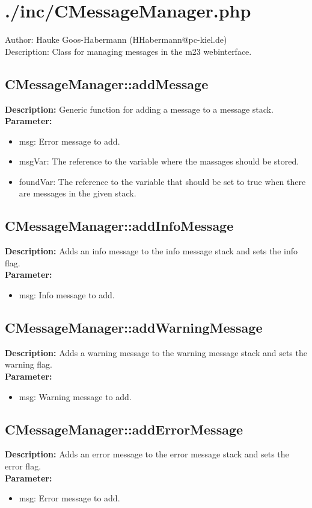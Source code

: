 \newpage\section{./inc/CMessageManager.php}
 Author: Hauke Goos-Habermann (HHabermann@pc-kiel.de)\\
 Description: Class for managing messages in the m23 webinterface.\\

\subsection{CMessageManager::addMessage}
\textbf{Description:} Generic function for adding a message to a message stack.\\
\textbf{Parameter:}
\begin{itemize}
\item msg: Error message to add.
\item msgVar: The reference to the variable where the massages should be stored.
\item foundVar: The reference to the variable that should be set to true when there are messages in the given stack.
\end{itemize}

\subsection{CMessageManager::addInfoMessage}
\textbf{Description:} Adds an info message to the info message stack and sets the info flag.\\
\textbf{Parameter:}
\begin{itemize}
\item msg: Info message to add.
\end{itemize}

\subsection{CMessageManager::addWarningMessage}
\textbf{Description:} Adds a warning message to the warning message stack and sets the warning flag.\\
\textbf{Parameter:}
\begin{itemize}
\item msg: Warning message to add.
\end{itemize}

\subsection{CMessageManager::addErrorMessage}
\textbf{Description:} Adds an error message to the error message stack and sets the error flag.\\
\textbf{Parameter:}
\begin{itemize}
\item msg: Error message to add.
\end{itemize}

